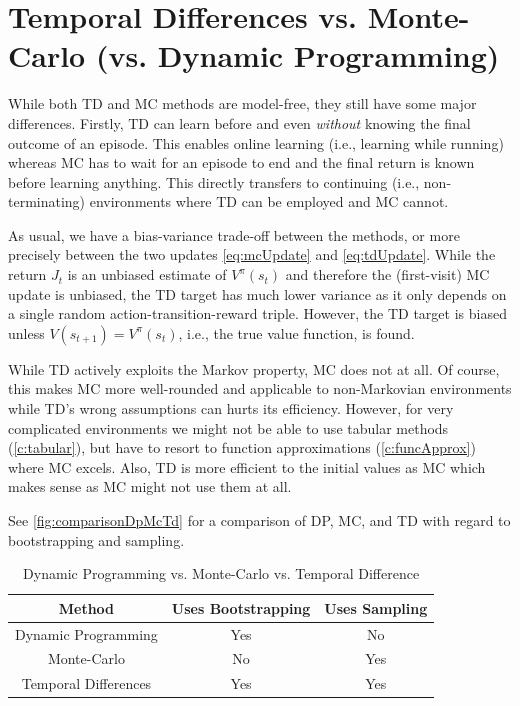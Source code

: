 	\section{Temporal Differences vs. Monte-Carlo (vs. Dynamic Programming)}
		While both \ac{TD} and \ac{MC} methods are model-free, they still have some major differences. Firstly, \ac{TD} can learn before and even \emph{without} knowing the final outcome of an episode. This enables online learning (i.e., learning while running) whereas \ac{MC} has to wait for an episode to end and the final return is known before learning anything. This directly transfers to continuing (i.e., non-terminating) environments where \ac{TD} can be employed and \ac{MC} cannot.

		As usual, we have a bias-variance trade-off between the methods, or more precisely between the two updates \eqref{eq:mcUpdate} and \eqref{eq:tdUpdate}. While the return \(J_t\) is an unbiased estimate of \(V^\pi(s_t)\) and therefore the (first-visit) \ac{MC} update is unbiased, the \ac{TD} target has much lower variance as it only depends on a single random action-transition-reward triple. However, the \ac{TD} target is biased unless \( V(s_{t + 1}) = V^\pi(s_t) \), i.e., the true value function, is found.

		While \ac{TD} actively exploits the Markov property, \ac{MC} does not at all. Of course, this makes \ac{MC} more well-rounded and applicable to non-Markovian environments while \ac{TD}'s wrong assumptions can hurts its efficiency. However, for very complicated environments we might not be able to use tabular methods (\autoref{c:tabular}), but have to resort to function approximations (\autoref{c:funcApprox}) where \ac{MC} excels. Also, \ac{TD} is more efficient to the initial values as \ac{MC} which makes sense as \ac{MC} might not use them at all.

		See \autoref{fig:comparisonDpMcTd} for a comparison of \ac{DP}, \ac{MC}, and \ac{TD} with regard to bootstrapping and sampling.

		\begin{table}
			\centering
			\begin{tabular}{c|cc}
				\toprule
				  \textbf{Method}    & \textbf{Uses Bootstrapping} & \textbf{Uses Sampling} \\ \midrule
				Dynamic Programming  &             Yes             &           No           \\
				    Monte-Carlo      &             No              &          Yes           \\
				Temporal Differences &             Yes             &          Yes           \\ \bottomrule
			\end{tabular}
			\caption{Dynamic Programming vs. Monte-Carlo vs. Temporal Difference}
			\label{fig:comparisonDpMcTd}
		\end{table}


